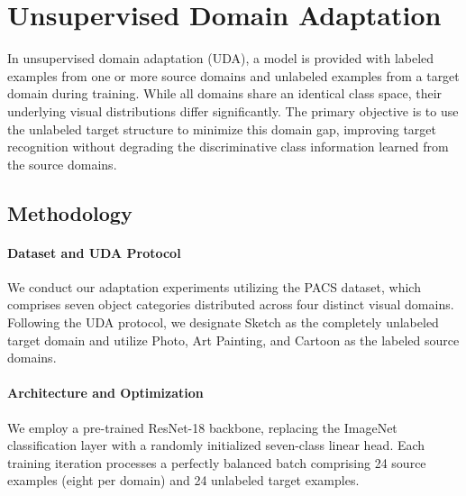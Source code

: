 \documentclass{article}
\begin{document}
\section{Unsupervised Domain Adaptation}
\label{section:uda}

In unsupervised domain adaptation (UDA), a model is provided with labeled examples from one or more source domains and unlabeled examples from a target domain during training. While all domains share an identical class space, their underlying visual distributions differ significantly. The primary objective is to use the unlabeled target structure to minimize this domain gap, improving target recognition without degrading the discriminative class information learned from the source domains.

\subsection{Methodology}

\paragraph{Dataset and UDA Protocol}
We conduct our adaptation experiments utilizing the PACS dataset, which comprises seven object categories distributed across four distinct visual domains. Following the UDA protocol, we designate Sketch as the completely unlabeled target domain and utilize Photo, Art Painting, and Cartoon as the labeled source domains.

\paragraph{Architecture and Optimization}
We employ a pre-trained ResNet-18 backbone, replacing the ImageNet classification layer with a randomly initialized seven-class linear head. Each training iteration processes a perfectly balanced batch comprising 24 source examples (eight per domain) and 24 unlabeled target examples. 
\end{document}
